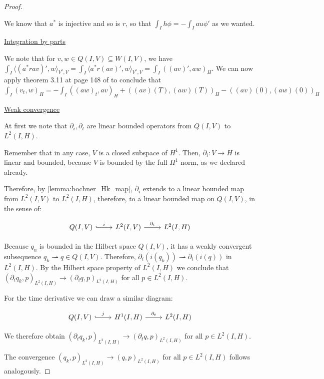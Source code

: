 \documentclass[english,a4paper,10pt,oneside]{scrbook}	%
\theoremstyle{break}
\newenvironment{mproof}[1][\proofname]{%
  \begin{proof}[#1]$ $\par\nobreak\ignorespaces
}{%
  \end{proof}
}
\renewcommand*{\proofname}{Proof}
\theoremstyle{remark}
\newcommand{\weakc}{\rightharpoonup}
\begin{document}
\begin{mproof}
We know that $a^*$ is injective and so is $r$, so that $ \int_I h \phi  = -\int_I au \phi'$ as we wanted.

\underline{Integration by parts}

We note that for $v,w \in Q(I,V)\subseteq W(I,V)$, we have $\int_I \langle (a^*ra v)', w\rangle_{V^*,V} = \int_I \langle a^*r(a v)', w\rangle_{V^*,V} = \int_I((a v)', aw)_H$. We can now apply theorem 3.11 at page 148 of \cite{trol} to conclude that  $\int_I(v_t,w)_H = -\int_I((aw)_t,av)_H +((av)(T),(aw)(T))_H-((av)(0),(aw)(0))_H$

\underline{Weak convergence}

At first we note that $\partial_i, \partial_t$ are linear bounded operators from $Q(I,V)$ to $L^2(I,H)$.

Remember that in any case, $V$ is a closed subspace of $H^1$. Then, $\partial_i : V\rightarrow H$ is linear and bounded, because $V$ is bounded by the full $H^1$ norm, as we declared already.

Therefore, by \cref{lemma:bochner_Hk_map}, $\partial_i$ extends to a linear bounded map from $L^2(I,V)$ to $L^2(I,H)$, therefore, to a linear bounded map on $Q(I,V)	$, in the sense of:

\[\begin{tikzcd}
	{Q(I,V)} & {L^2(I,V)} & {L^2(I,H)}
	\arrow["i", hook, from=1-1, to=1-2]
	\arrow["{\partial_i}", from=1-2, to=1-3]
\end{tikzcd}\]

Because $q_n$ is bounded in the Hilbert space $Q(I,V)$, it has a weakly convergent subsequence $q_k\weakc q \in Q(I,V)$. Therefore, $\partial_i (i(q_k))\weakc \partial_i (i(q))$ in $L^2(I,H)$. By the Hilbert space property of $L^2(I,H)$ we conclude that $(\partial_i q_k,p)_{L^2(I,H)}\rightarrow (\partial_i q,p)_{L^2(I,H)}$ for all $p \in L^2(I,H)$.

For the time derivative we can draw a similar diagram:

\[\begin{tikzcd}
	{Q(I,V)} & {H^1(I,H)} & {L^2(I,H)}
	\arrow["j", hook, from=1-1, to=1-2]
	\arrow["{\partial_t}", from=1-2, to=1-3]
\end{tikzcd}\]

We therefore obtain $(\partial_t q_k,p)_{L^2(I,H)}\rightarrow (\partial_t q,p)_{L^2(I,H)}$ for all $p \in L^2(I,H)$.

The convergence $(q_k,p)_{L^2(I,H)}\rightarrow (q,p)_{L^2(I,H)}$ for all $p \in L^2(I,H)$ follows analogously.

\end{mproof}
\end{document}
